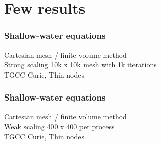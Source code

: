\documentclass{beamer}
\begin{document}
\section{Few results}
\begin{frame}
\frametitle{Shallow-water equations}
\begin{center}
Cartesian mesh / finite volume method\\Strong scaling 10k x 10k mesh with 1k iterations\\TGCC Curie, Thin nodes
\end{center}
\end{frame}
\begin{frame}
\frametitle{Shallow-water equations}
\begin{center}
Cartesian mesh / finite volume method\\Weak scaling 400 x 400 per process\\TGCC Curie, Thin nodes
\end{center}
\end{frame}
\end{document}
